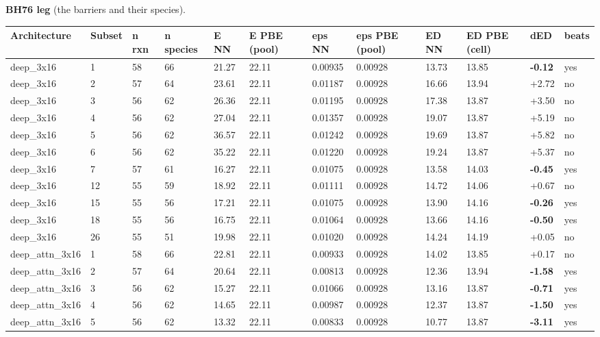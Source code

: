 \documentclass[10pt,a4paper]{article}
\begin{document}
\begin{landscape}
\textbf{BH76 leg} (the barriers and their species).

\begin{footnotesize}
\begin{longtable}{llllllllllll}
\toprule Architecture & Subset & n rxn & n species & E NN & E PBE (pool) & eps NN & eps PBE (pool) & ED NN & ED PBE (cell) & dED & beats \\ \midrule \endhead
deep\_3x16 & 1 & 58 & 66 & 21.27 & 22.11 & 0.00935 & 0.00928 & 13.73 & 13.85 & \textbf{-0.12} & yes \\
deep\_3x16 & 2 & 57 & 64 & 23.61 & 22.11 & 0.01187 & 0.00928 & 16.66 & 13.94 & +2.72 & no \\
deep\_3x16 & 3 & 56 & 62 & 26.36 & 22.11 & 0.01195 & 0.00928 & 17.38 & 13.87 & +3.50 & no \\
deep\_3x16 & 4 & 56 & 62 & 27.04 & 22.11 & 0.01357 & 0.00928 & 19.07 & 13.87 & +5.19 & no \\
deep\_3x16 & 5 & 56 & 62 & 36.57 & 22.11 & 0.01242 & 0.00928 & 19.69 & 13.87 & +5.82 & no \\
deep\_3x16 & 6 & 56 & 62 & 35.22 & 22.11 & 0.01220 & 0.00928 & 19.24 & 13.87 & +5.37 & no \\
deep\_3x16 & 7 & 57 & 61 & 16.27 & 22.11 & 0.01075 & 0.00928 & 13.58 & 14.03 & \textbf{-0.45} & yes \\
deep\_3x16 & 12 & 55 & 59 & 18.92 & 22.11 & 0.01111 & 0.00928 & 14.72 & 14.06 & +0.67 & no \\
deep\_3x16 & 15 & 55 & 56 & 17.21 & 22.11 & 0.01075 & 0.00928 & 13.90 & 14.16 & \textbf{-0.26} & yes \\
deep\_3x16 & 18 & 55 & 56 & 16.75 & 22.11 & 0.01064 & 0.00928 & 13.66 & 14.16 & \textbf{-0.50} & yes \\
deep\_3x16 & 26 & 55 & 51 & 19.98 & 22.11 & 0.01020 & 0.00928 & 14.24 & 14.19 & +0.05 & no \\
deep\_attn\_3x16 & 1 & 58 & 66 & 22.81 & 22.11 & 0.00933 & 0.00928 & 14.02 & 13.85 & +0.17 & no \\
deep\_attn\_3x16 & 2 & 57 & 64 & 20.64 & 22.11 & 0.00813 & 0.00928 & 12.36 & 13.94 & \textbf{-1.58} & yes \\
deep\_attn\_3x16 & 3 & 56 & 62 & 15.27 & 22.11 & 0.01066 & 0.00928 & 13.16 & 13.87 & \textbf{-0.71} & yes \\
deep\_attn\_3x16 & 4 & 56 & 62 & 14.65 & 22.11 & 0.00987 & 0.00928 & 12.37 & 13.87 & \textbf{-1.50} & yes \\
deep\_attn\_3x16 & 5 & 56 & 62 & 13.32 & 22.11 & 0.00833 & 0.00928 & 10.77 & 13.87 & \textbf{-3.11} & yes \\

\end{longtable}
\end{footnotesize}
\end{landscape}
\end{document}

